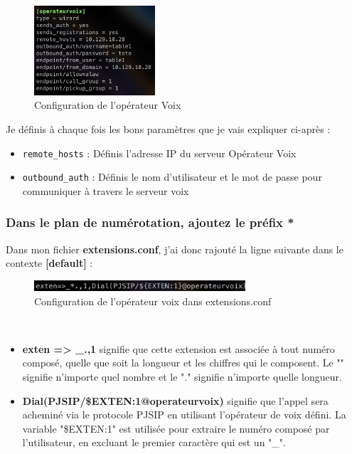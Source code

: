 \documentclass[12pt, a4paper]{article}
\begin{document}
	\begin{figure}[h]
		\centering
		\includegraphics[width=0.4\textwidth]{img/inter.png}
		\caption{Configuration de l'opérateur Voix}
		\label{fig:opvoix}
	\end{figure}
	Je définis à chaque fois les bons paramètres que je vais expliquer ci-après :
	\begin{itemize}
		\item \texttt{remote\_hosts} : Définis l'adresse IP du serveur Opérateur Voix
		\item \texttt{outbound\_auth} : Définis le nom d'utilisateur et le mot de passe pour communiquer à travers le serveur voix
	\end{itemize}


	\subsubsection{Dans le plan de numérotation, ajoutez le préfix *}
	Dans mon fichier \textbf{extensions.conf}, j'ai donc rajouté la ligne suivante
	dans le contexte \textbf{[default]} :
	\begin{figure}[h]
		\centering
		\includegraphics[width=0.7\textwidth]{img/exten-op.png}
		\caption{Configuration de l'opérateur voix dans extensions.conf}
		\label{fig:op-ext}
	\end{figure}\\
	\begin{itemize}
		\item \textbf{exten => \_.,1} signifie que cette extension est associée à tout numéro composé, quelle que soit la longueur et les chiffres qui le composent. Le "" signifie n'importe quel nombre et le "." signifie n'importe quelle longueur.
		\item \textbf{Dial(PJSIP/\${EXTEN:1}@operateurvoix)} signifie que l'appel sera acheminé via le protocole PJSIP en utilisant l'opérateur de voix défini. La variable "\${EXTEN:1}" est utilisée pour extraire le numéro composé par l'utilisateur, en excluant le premier caractère qui est un "\_".
	\end{itemize}
\end{document}
